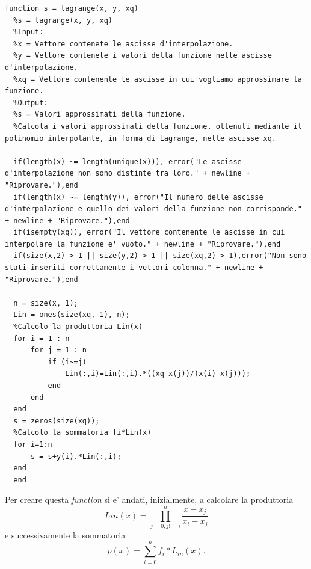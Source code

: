 \documentclass[10pt,a4paper]{article}
\begin{document}
\begin{lstlisting}[style=Matlab-editor]
  function s = lagrange(x, y, xq)
  %s = lagrange(x, y, xq)
  %Input:
  %x = Vettore contenete le ascisse d'interpolazione.
  %y = Vettore contenete i valori della funzione nelle ascisse d'interpolazione.
  %xq = Vettore contenente le ascisse in cui vogliamo approssimare la funzione.
  %Output:
  %s = Valori approssimati della funzione.
  %Calcola i valori approssimati della funzione, ottenuti mediante il polinomio interpolante, in forma di Lagrange, nelle ascisse xq.
  
  if(length(x) ~= length(unique(x))), error("Le ascisse d'interpolazione non sono distinte tra loro." + newline + "Riprovare."),end 
  if(length(x) ~= length(y)), error("Il numero delle ascisse d'interpolazione e quello dei valori della funzione non corrisponde." + newline + "Riprovare."),end
  if(isempty(xq)), error("Il vettore contenente le ascisse in cui interpolare la funzione e' vuoto." + newline + "Riprovare."),end
  if(size(x,2) > 1 || size(y,2) > 1 || size(xq,2) > 1),error("Non sono stati inseriti correttamente i vettori colonna." + newline + "Riprovare."),end
   
  n = size(x, 1);
  Lin = ones(size(xq, 1), n);
  %Calcolo la produttoria Lin(x)
  for i = 1 : n
      for j = 1 : n
          if (i~=j)
              Lin(:,i)=Lin(:,i).*((xq-x(j))/(x(i)-x(j)));
          end
      end
  end
  s = zeros(size(xq));
  %Calcolo la sommatoria fi*Lin(x)
  for i=1:n
      s = s+y(i).*Lin(:,i);
  end
  end
\end{lstlisting}

Per creare questa \textit{function} si e' andati, inizialmente, a calcolare la 
produttoria \[ Lin(x) = \prod_{j = 0, j != i}^{n} \frac{x - x_j}{x_i - x_j} \]
e successivamente la sommatoria \[ p(x) = \sum_{i = 0}^{n} f_i * L_{in}(x). \]
\end{document}
